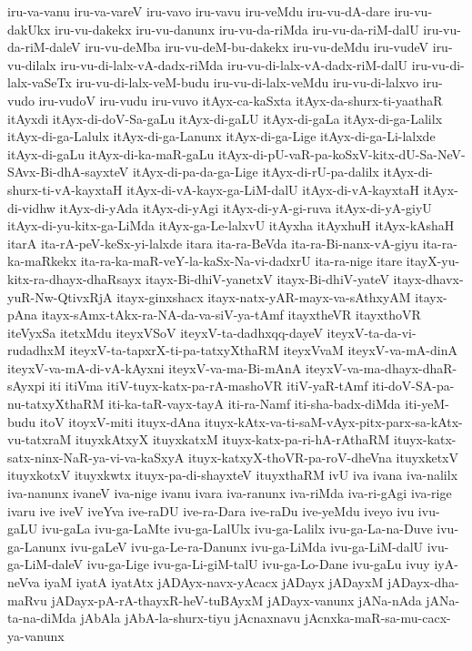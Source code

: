 {iru-va-vanu
iru-va-vareV
iru-vavo
iru-vavu
iru-veMdu
iru-vu-dA-dare
iru-vu-dakUkx
iru-vu-dakekx
iru-vu-danunx
iru-vu-da-riMda
iru-vu-da-riM-dalU
iru-vu-da-riM-daleV
iru-vu-deMba
iru-vu-deM-bu-dakekx
iru-vu-deMdu
iru-vudeV
iru-vu-dilalx
iru-vu-di-lalx-vA-dadx-riMda
iru-vu-di-lalx-vA-dadx-riM-dalU
iru-vu-di-lalx-vaSeTx
iru-vu-di-lalx-veM-budu
iru-vu-di-lalx-veMdu
iru-vu-di-lalxvo
iru-vudo
iru-vudoV
iru-vudu
iru-vuvo
itAyx-ca-kaSxta
itAyx-da-shurx-ti-yaathaR
itAyxdi
itAyx-di-doV-Sa-gaLu
itAyx-di-gaLU
itAyx-di-gaLa
itAyx-di-ga-Lalilx
itAyx-di-ga-Lalulx
itAyx-di-ga-Lanunx
itAyx-di-ga-Lige
itAyx-di-ga-Li-lalxde
itAyx-di-gaLu
itAyx-di-ka-maR-gaLu
itAyx-di-pU-vaR-pa-koSxV-kitx-dU-Sa-NeV-SAvx-Bi-dhA-sayxteV
itAyx-di-pa-da-ga-Lige
itAyx-di-rU-pa-dalilx
itAyx-di-shurx-ti-vA-kayxtaH
itAyx-di-vA-kayx-ga-LiM-dalU
itAyx-di-vA-kayxtaH
itAyx-di-vidhw
itAyx-di-yAda
itAyx-di-yAgi
itAyx-di-yA-gi-ruva
itAyx-di-yA-giyU
itAyx-di-yu-kitx-ga-LiMda
itAyx-ga-Le-lalxvU
itAyxha
itAyxhuH
itAyx-kAshaH
itarA
ita-rA-peV-keSx-yi-lalxde
itara
ita-ra-BeVda
ita-ra-Bi-nanx-vA-giyu
ita-ra-ka-maRkekx
ita-ra-ka-maR-veY-la-kaSx-Na-vi-dadxrU
ita-ra-nige
itare
itayX-yu-kitx-ra-dhayx-dhaRsayx
itayx-Bi-dhiV-yanetxV
itayx-Bi-dhiV-yateV
itayx-dhavx-yuR-Nw-QtivxRjA
itayx-ginxshacx
itayx-natx-yAR-mayx-va-sAthxyAM
itayx-pAna
itayx-sAmx-tAkx-ra-NA-da-va-siV-ya-tAmf
itayxtheVR
itayxthoVR
iteVyxSa
itetxMdu
iteyxVSoV
iteyxV-ta-dadhxqq-dayeV
iteyxV-ta-da-vi-rudadhxM
iteyxV-ta-tapxrX-ti-pa-tatxyXthaRM
iteyxVvaM
iteyxV-va-mA-dinA
iteyxV-va-mA-di-vA-kAyxni
iteyxV-va-ma-Bi-mAnA
iteyxV-va-ma-dhayx-dhaR-sAyxpi
iti
itiVma
itiV-tuyx-katx-pa-rA-mashoVR
itiV-yaR-tAmf
iti-doV-SA-pa-nu-tatxyXthaRM
iti-ka-taR-vayx-tayA
iti-ra-Namf
iti-sha-badx-diMda
iti-yeM-budu
itoV
itoyxV-miti
ituyx-dAna
ituyx-kAtx-va-ti-saM-vAyx-pitx-parx-sa-kAtx-vu-tatxraM
ituyxkAtxyX
ituyxkatxM
ituyx-katx-pa-ri-hA-rAthaRM
ituyx-katx-satx-ninx-NaR-ya-vi-va-kaSxyA
ituyx-katxyX-thoVR-pa-roV-dheVna
ituyxketxV
ituyxkotxV
ituyxkwtx
ituyx-pa-di-shayxteV
ituyxthaRM
ivU
iva
ivana
iva-nalilx
iva-nanunx
ivaneV
iva-nige
ivanu
ivara
iva-ranunx
iva-riMda
iva-ri-gAgi
iva-rige
ivaru
ive
iveV
iveYva
ive-raDU
ive-ra-Dara
ive-raDu
ive-yeMdu
iveyo
ivu
ivu-gaLU
ivu-gaLa
ivu-ga-LaMte
ivu-ga-LalUlx
ivu-ga-Lalilx
ivu-ga-La-na-Duve
ivu-ga-Lanunx
ivu-gaLeV
ivu-ga-Le-ra-Danunx
ivu-ga-LiMda
ivu-ga-LiM-dalU
ivu-ga-LiM-daleV
ivu-ga-Lige
ivu-ga-Li-giM-talU
ivu-ga-Lo-Dane
ivu-gaLu
ivuy
iyA-neVva
iyaM
iyatA
iyatAtx
jADAyx-navx-yAcacx
jADayx
jADayxM
jADayx-dha-maRvu
jADayx-pA-rA-thayxR-heV-tuBAyxM
jADayx-vanunx
jANa-nAda
jANa-ta-na-diMda
jAbAla
jAbA-la-shurx-tiyu
jAcnaxnavu
jAcnxka-maR-sa-mu-cacx-ya-vanunx
}
